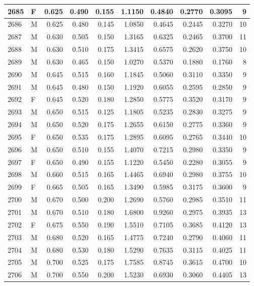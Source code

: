 \documentclass[9pt,twocolumn,twoside,]{pnas-new}
\begin{document}
\begin{tabular}{l|l|r|r|r|r|r|r|r|r}
\hline
2685 & F & 0.625 & 0.490 & 0.155 & 1.1150 & 0.4840 & 0.2770 & 0.3095 & 9\\
\hline
2686 & M & 0.625 & 0.480 & 0.145 & 1.0850 & 0.4645 & 0.2445 & 0.3270 & 10\\
\hline
2687 & M & 0.630 & 0.505 & 0.150 & 1.3165 & 0.6325 & 0.2465 & 0.3700 & 11\\
\hline
2688 & M & 0.630 & 0.510 & 0.175 & 1.3415 & 0.6575 & 0.2620 & 0.3750 & 10\\
\hline
2689 & M & 0.630 & 0.465 & 0.150 & 1.0270 & 0.5370 & 0.1880 & 0.1760 & 8\\
\hline
2690 & M & 0.645 & 0.515 & 0.160 & 1.1845 & 0.5060 & 0.3110 & 0.3350 & 9\\
\hline
2691 & M & 0.645 & 0.480 & 0.150 & 1.1920 & 0.6055 & 0.2595 & 0.2850 & 9\\
\hline
2692 & F & 0.645 & 0.520 & 0.180 & 1.2850 & 0.5775 & 0.3520 & 0.3170 & 9\\
\hline
2693 & M & 0.650 & 0.515 & 0.125 & 1.1805 & 0.5235 & 0.2830 & 0.3275 & 9\\
\hline
2694 & M & 0.650 & 0.520 & 0.175 & 1.2655 & 0.6150 & 0.2775 & 0.3360 & 9\\
\hline
2695 & F & 0.650 & 0.535 & 0.175 & 1.2895 & 0.6095 & 0.2765 & 0.3440 & 10\\
\hline
2696 & M & 0.650 & 0.510 & 0.155 & 1.4070 & 0.7215 & 0.2980 & 0.3350 & 9\\
\hline
2697 & F & 0.650 & 0.490 & 0.155 & 1.1220 & 0.5450 & 0.2280 & 0.3055 & 9\\
\hline
2698 & M & 0.660 & 0.515 & 0.165 & 1.4465 & 0.6940 & 0.2980 & 0.3755 & 10\\
\hline
2699 & F & 0.665 & 0.505 & 0.165 & 1.3490 & 0.5985 & 0.3175 & 0.3600 & 9\\
\hline
2700 & M & 0.670 & 0.500 & 0.200 & 1.2690 & 0.5760 & 0.2985 & 0.3510 & 11\\
\hline
2701 & M & 0.670 & 0.510 & 0.180 & 1.6800 & 0.9260 & 0.2975 & 0.3935 & 13\\
\hline
2702 & F & 0.675 & 0.550 & 0.190 & 1.5510 & 0.7105 & 0.3685 & 0.4120 & 13\\
\hline
2703 & M & 0.680 & 0.520 & 0.165 & 1.4775 & 0.7240 & 0.2790 & 0.4060 & 11\\
\hline
2704 & M & 0.680 & 0.530 & 0.180 & 1.5290 & 0.7635 & 0.3115 & 0.4025 & 11\\
\hline
2705 & M & 0.700 & 0.525 & 0.175 & 1.7585 & 0.8745 & 0.3615 & 0.4700 & 10\\
\hline
2706 & M & 0.700 & 0.550 & 0.200 & 1.5230 & 0.6930 & 0.3060 & 0.4405 & 13\\

\end{tabular}
\end{document}
